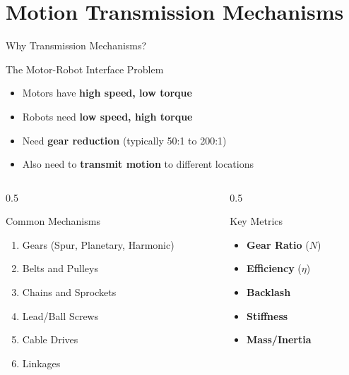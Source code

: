 \documentclass[10pt]{beamer}
\begin{document}
\section{Motion Transmission Mechanisms}
\begin{frame}{Why Transmission Mechanisms?}
    \begin{block}{The Motor-Robot Interface Problem}
        \begin{itemize}
            \item Motors have \textbf{high speed, low torque}
            \item Robots need \textbf{low speed, high torque}
            \item Need \textbf{gear reduction} (typically 50:1 to 200:1)
            \item Also need to \textbf{transmit motion} to different locations
        \end{itemize}
    \end{block}
    
    \begin{columns}
        \begin{column}{0.5\textwidth}
            \begin{exampleblock}{Common Mechanisms}
                \begin{enumerate}
                    \item Gears (Spur, Planetary, Harmonic)
                    \item Belts and Pulleys
                    \item Chains and Sprockets
                    \item Lead/Ball Screws
                    \item Cable Drives
                    \item Linkages
                \end{enumerate}
            \end{exampleblock}
        \end{column}
        
        \begin{column}{0.5\textwidth}
            \begin{alertblock}{Key Metrics}
                \begin{itemize}
                    \footnotesize
                    \item \textbf{Gear Ratio} ($N$)
                    \item \textbf{Efficiency} ($\eta$)
                    \item \textbf{Backlash}
                    \item \textbf{Stiffness}
                    \item \textbf{Mass/Inertia}
                \end{itemize}
            \end{alertblock}
        \end{column}
    \end{columns}
\end{frame}
\end{document}
